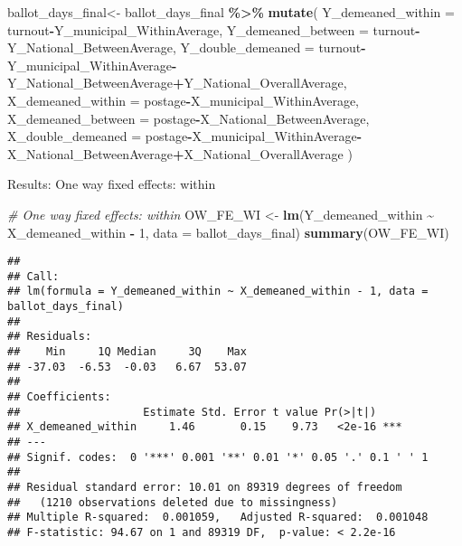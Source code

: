 \documentclass[
]{book}
\newenvironment{Shaded}{\begin{snugshade}}{\end{snugshade}}
\newcommand{\AttributeTok}[1]{\textcolor[rgb]{0.13,0.29,0.53}{#1}}
\newcommand{\CommentTok}[1]{\textcolor[rgb]{0.56,0.35,0.01}{\textit{#1}}}
\newcommand{\DecValTok}[1]{\textcolor[rgb]{0.00,0.00,0.81}{#1}}
\newcommand{\FunctionTok}[1]{\textcolor[rgb]{0.13,0.29,0.53}{\textbf{#1}}}
\newcommand{\NormalTok}[1]{#1}
\newcommand{\OtherTok}[1]{\textcolor[rgb]{0.56,0.35,0.01}{#1}}
\newcommand{\SpecialCharTok}[1]{\textcolor[rgb]{0.81,0.36,0.00}{\textbf{#1}}}
\begin{document}
\begin{Shaded}
\begin{Highlighting}[]
\NormalTok{ballot\_days\_final}\OtherTok{\textless{}{-}}\NormalTok{ ballot\_days\_final }\SpecialCharTok{\%\textgreater{}\%}
  \FunctionTok{mutate}\NormalTok{( }\AttributeTok{Y\_demeaned\_within =}\NormalTok{ turnout}\SpecialCharTok{{-}}\NormalTok{Y\_municipal\_WithinAverage,}
          \AttributeTok{Y\_demeaned\_between =}\NormalTok{ turnout}\SpecialCharTok{{-}}\NormalTok{Y\_National\_BetweenAverage,}
          \AttributeTok{Y\_double\_demeaned =}\NormalTok{ turnout}\SpecialCharTok{{-}}\NormalTok{Y\_municipal\_WithinAverage}\SpecialCharTok{{-}}\NormalTok{Y\_National\_BetweenAverage}\SpecialCharTok{+}\NormalTok{Y\_National\_OverallAverage,}
          \AttributeTok{X\_demeaned\_within =}\NormalTok{ postage}\SpecialCharTok{{-}}\NormalTok{X\_municipal\_WithinAverage,}
          \AttributeTok{X\_demeaned\_between =}\NormalTok{ postage}\SpecialCharTok{{-}}\NormalTok{X\_National\_BetweenAverage,}
          \AttributeTok{X\_double\_demeaned =}\NormalTok{ postage}\SpecialCharTok{{-}}\NormalTok{X\_municipal\_WithinAverage}\SpecialCharTok{{-}}\NormalTok{X\_National\_BetweenAverage}\SpecialCharTok{+}\NormalTok{X\_National\_OverallAverage}
\NormalTok{        )}
\end{Highlighting}
\end{Shaded}

Results: One way fixed effects: within

\begin{Shaded}
\begin{Highlighting}[]
\CommentTok{\# One way fixed effects: within}
\NormalTok{OW\_FE\_WI }\OtherTok{\textless{}{-}} \FunctionTok{lm}\NormalTok{(Y\_demeaned\_within }\SpecialCharTok{\textasciitilde{}}\NormalTok{ X\_demeaned\_within }\SpecialCharTok{{-}} \DecValTok{1}\NormalTok{, }\AttributeTok{data =}\NormalTok{ ballot\_days\_final)}
\FunctionTok{summary}\NormalTok{(OW\_FE\_WI)}
\end{Highlighting}
\end{Shaded}

\begin{verbatim}
## 
## Call:
## lm(formula = Y_demeaned_within ~ X_demeaned_within - 1, data = ballot_days_final)
## 
## Residuals:
##    Min     1Q Median     3Q    Max 
## -37.03  -6.53  -0.03   6.67  53.07 
## 
## Coefficients:
##                   Estimate Std. Error t value Pr(>|t|)    
## X_demeaned_within     1.46       0.15    9.73   <2e-16 ***
## ---
## Signif. codes:  0 '***' 0.001 '**' 0.01 '*' 0.05 '.' 0.1 ' ' 1
## 
## Residual standard error: 10.01 on 89319 degrees of freedom
##   (1210 observations deleted due to missingness)
## Multiple R-squared:  0.001059,   Adjusted R-squared:  0.001048 
## F-statistic: 94.67 on 1 and 89319 DF,  p-value: < 2.2e-16
\end{verbatim}
\end{document}

